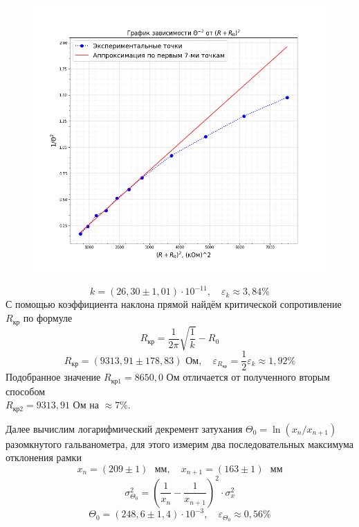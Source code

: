 \documentclass[a4paper,12pt]{article}
\begin{document}
\begin{figure}[H]\label{fig: ThetaPow-2(R + R0)Pow2}
    \centering
    \includegraphics[width = \textwidth]{ThetaPow-2(R + R0)Pow2.png}
\end{figure}
\[k = (26,30 \pm 1,01) \cdot 10^{-11}, \quad \varepsilon_k \approx 3,84 \%\]
С помощью коэффициента наклона прямой найдём критической сопротивление $R_{кр}$ по формуле
\[R_{кр} = \frac{1}{2\pi} \sqrt{\frac{1}{k}} - R_0\]
\[R_{кр} = (9313,91 \pm 178,83) \text{ Ом}, \quad \varepsilon_{R_{кр}} = \frac{1}{2} \varepsilon_k \approx 1,92 \%\]
Подобранное значение $R_{кр1} = 8650,0$ Ом отличается от полученного вторым способом \\ $R_{кр2} = 9313,91$ Ом на $\approx 7 \%$.

Далее вычислим логарифмический декремент затухания $\Theta_0 = \ln ({x_n / x_{n + 1}})$ разомкнутого гальванометра, для этого измерим два последовательных максимума отклонения рамки
\[x_n = (209 \pm 1) \text{ }мм, \quad x_{n + 1} = (163 \pm 1) \text{ } мм\]
\[\sigma_{\Theta_0}^2 = (\frac{1}{{x_n}} - \frac{1}{x_{n + 1}})^2 \cdot \sigma_x^2\]
\[\Theta_0 = (248,6 \pm 1,4)\cdot 10^{-3}, \quad \varepsilon_{\Theta_0} \approx 0,56 \%\]
\end{document}
